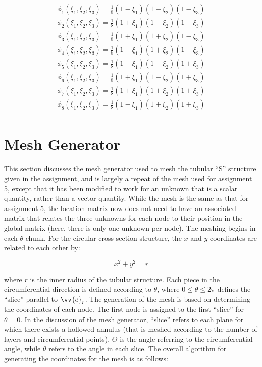 \documentclass[10pt]{article}
\begin{document}
\begin{equation}
\label{eq:Bricks}
\begin{aligned}
\phi_1(\xi_1,\xi_2,\xi_3)=\frac{1}{8}(1-\xi_1)(1-\xi_2)(1-\xi_3)\\
\phi_2(\xi_1,\xi_2,\xi_3)=\frac{1}{8}(1+\xi_1)(1-\xi_2)(1-\xi_3)\\
\phi_3(\xi_1,\xi_2,\xi_3)=\frac{1}{8}(1+\xi_1)(1+\xi_2)(1-\xi_3)\\
\phi_4(\xi_1,\xi_2,\xi_3)=\frac{1}{8}(1-\xi_1)(1+\xi_2)(1-\xi_3)\\
\phi_5(\xi_1,\xi_2,\xi_3)=\frac{1}{8}(1-\xi_1)(1-\xi_2)(1+\xi_3)\\
\phi_6(\xi_1,\xi_2,\xi_3)=\frac{1}{8}(1+\xi_1)(1-\xi_2)(1+\xi_3)\\
\phi_7(\xi_1,\xi_2,\xi_3)=\frac{1}{8}(1+\xi_1)(1+\xi_2)(1+\xi_3)\\
\phi_8(\xi_1,\xi_2,\xi_3)=\frac{1}{8}(1-\xi_1)(1+\xi_2)(1+\xi_3)\\
\end{aligned}
\end{equation}

\section{Mesh Generator}

This section discusses the mesh generator used to mesh the tubular ``S'' structure given in the assignment, and is largely a repeat of the mesh used for assignment 5, except that it has been modified to work for an unknown that is a scalar quantity, rather than a vector quantity. While the mesh is the same as that for assignment 5, the location matrix now does not need to have an associated matrix that relates the three unknowns for each node to their position in the global matrix (here, there is only one unknown per node). The meshing begins in each \(\theta\)-chunk. For the circular cross-section structure, the \(x\) and \(y\) coordinates are related to each other by:

\begin{equation}
\label{eq:xy}
x^2+y^2=r
\end{equation}

where \(r\) is the inner radius of the tubular structure. Each piece in the circumferential direction is defined according to \(\theta\), where \(0\leq\theta\leq2\pi\) defines the ``slice'' parallel to \(\vv{e}_r\). The generation of the mesh is based on determining the coordinates of each node. The first node is assigned to the first ``slice'' for \(\theta=0\). In the discussion of the mesh generator, ``slice'' refers to each plane for which there exists a hollowed annulus (that is meshed according to the number of layers and circumferential points). \(\Theta\) is the angle referring to the circumferential angle, while \(\theta\) refers to the angle in each slice. The overall algorithm for generating the coordinates for the mesh is as follows:
\end{document}
